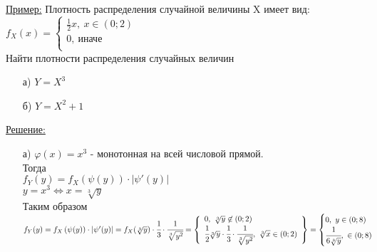 \underline{Пример:} Плотность распределения случайной величины X имеет вид:\\
$f_X(x) = 
\begin{cases}
	\frac{1}{2} x, \ x \in (0; 2)\\
	0, \ \text{иначе}\\
\end{cases}$\\
Найти плотности распределения случайных величин\\
\begin{enumerate}
	\item[а)] $Y = X^3$
	\item[б)] $Y = X^2 + 1$
\end{enumerate}
\underline{Решение:}
\begin{enumerate}
	\item[а)] 
	$\varphi(x) = x^3$ - монотонная на всей числовой прямой.\\
	Тогда\\
	$f_Y(y) = f_X \left(\psi(y)\right) \cdot |\psi'(y)|$\\
	$y = x^3 \Leftrightarrow x = \sqrt[3]{y}$\\
	Таким образом\\
	$f_Y(y) = f_X \left(\psi(y)\right) \cdot |\psi'(y)| = f_X(\sqrt[3]{y}) \cdot \cfrac{1}{3} \cdot \cfrac{1}{\sqrt[3]{y^2}} = \left\{
	\begin{array}{lll}
		0, \ \sqrt[3]{y} \not\in (0; 2)\\
		\cfrac{1}{2} \sqrt[3]{y} \cdot \cfrac{1}{3} \cdot \cfrac{1}{\sqrt[3]{y^2}}, \ \sqrt[3]{x} \in (0; 2)
	\end{array} \right\} =
	\begin{cases}
		0, \ y \in (0; 8)\\
		\cfrac{1}{6 \sqrt[3]{y}}, \ \in (0; 8)\\
	\end{cases}$\\
	

\end{enumerate}
